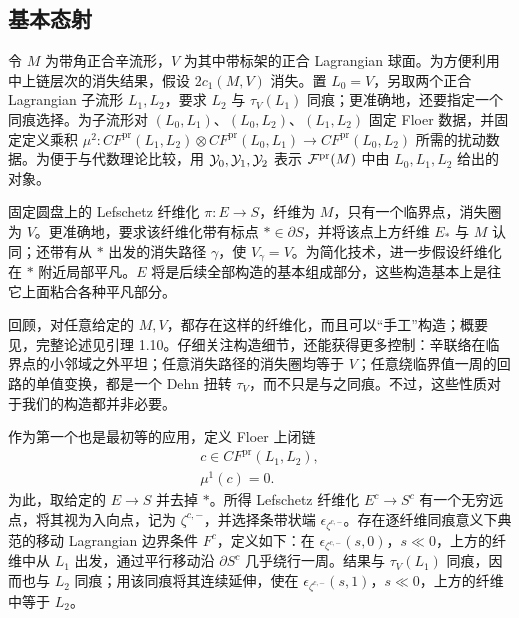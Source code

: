 \subsection{基本态射}\label{sec:17d}
令 $M$ 为带角正合辛流形，$V$ 为其中带标架的正合 Lagrangian 球面。为方便利用中上链层次的消失结果，假设 $2c_1(M,V)$ 消失。置 $L_0=V$，另取两个正合 Lagrangian 子流形 $L_1,L_2$，要求 $L_2$ 与 $\tau_V(L_1)$ 同痕；更准确地，还要指定一个同痕选择。为子流形对 $(L_0,L_1)$、$(L_0,L_2)$、$(L_1,L_2)$ 固定 Floer 数据，并固定定义乘积 $\mu^2:CF^{\mathrm{pr}}(L_1,L_2)\otimes CF^{\mathrm{pr}}(L_0,L_1)\to CF^{\mathrm{pr}}(L_0,L_2)$ 所需的扰动数据。为便于与代数理论比较，用 $\mathcal Y_0,\mathcal Y_1,\mathcal Y_2$ 表示 $\mathcal F^{\mathrm{pr}}(M)$ 中由 $L_0,L_1,L_2$ 给出的对象。

固定圆盘上的 Lefschetz 纤维化 $\pi:E\to S$，纤维为 $M$，只有一个临界点，消失圈为 $V$。更准确地，要求该纤维化带有标点 $*\in\partial S$，并将该点上方纤维 $E_*$ 与 $M$ 认同；还带有从 $*$ 出发的消失路径 $\gamma$，使 $V_\gamma=V$。为简化技术，进一步假设纤维化在 $*$ 附近局部平凡。$E$ 将是后续全部构造的基本组成部分，这些构造基本上是往它上面粘合各种平凡部分。

\begin{note}\label{st:17.9}
回顾，对任意给定的 $M,V$，都存在这样的纤维化，而且可以“手工”构造；概要见，完整论述见引理 1.10。仔细关注构造细节，还能获得更多控制：辛联络在临界点的小邻域之外平坦；任意消失路径的消失圈均等于 $V$；任意绕临界值一周的回路的单值变换，都是一个 Dehn 扭转 $\tau_V$，而不只是与之同痕。不过，这些性质对于我们的构造都并非必要。
\end{note}

作为第一个也是最初等的应用，定义 Floer 上闭链
\begin{equation}\label{eq:17.12}
\boxed{\begin{gathered}
c\in CF^{\mathrm{pr}}(L_1,L_2),\\ \mu^1(c)=0.
\end{gathered}}
\end{equation}
为此，取给定的 $E\to S$ 并去掉 $*$。所得 Lefschetz 纤维化 $E^c\to S^c$ 有一个无穷远点，将其视为入向点，记为 $\zeta^{c,-}$，并选择条带状端 $\epsilon_{\zeta^{c,-}}$。存在逐纤维同痕意义下典范的移动 Lagrangian 边界条件 $F^c$，定义如下：在 $\epsilon_{\zeta^{c,-}}(s,0)$，$s\ll0$，上方的纤维中从 $L_1$ 出发，通过平行移动沿 $\partial S^c$ 几乎绕行一周。结果与 $\tau_V(L_1)$ 同痕，因而也与 $L_2$ 同痕；用该同痕将其连续延伸，使在 $\epsilon_{\zeta^{c,-}}(s,1)$，$s\ll0$，上方的纤维中等于 $L_2$。

